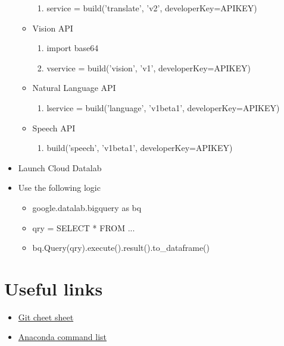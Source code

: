 \documentclass[12pt]{article}
\begin{document}
\begin{itemize}
\begin{itemize}
\begin{enumerate}
    \item service = build('translate', 'v2', developerKey=APIKEY)
  \end{enumerate}
  \item Vision API
  \begin{enumerate}
    \item import base64
    \item vservice = build('vision', 'v1', developerKey=APIKEY)
  \end{enumerate}
  \item Natural Language API
  \begin{enumerate}
    \item lservice = build('language', 'v1beta1', developerKey=APIKEY)
  \end{enumerate}
  \item Speech API
  \begin{enumerate}
    \item build('speech', 'v1beta1', developerKey=APIKEY)
  \end{enumerate}
\end{itemize}

  \item Launch Cloud Datalab
  \item Use the following logic
  \begin{itemize}
    \item google.datalab.bigquery as bq
    \item qry = \textsc{}\textsc{}\textsc{} SELECT * FROM ...\textsc{}\textsc{}\textsc{}
    \item bq.Query(qry).execute().result().to\_dataframe()
  \end{itemize}

\end{itemize}


\section{Useful links}

\begin{itemize}
\item\href{https://github.github.com/training-kit/downloads/github-git-cheat-sheet.pdf}{Git cheet sheet}
\item\href{https://docs.conda.io/projects/conda/en/4.6.0/commands.html}{Anaconda command list}
\end{itemize}
\end{document}
